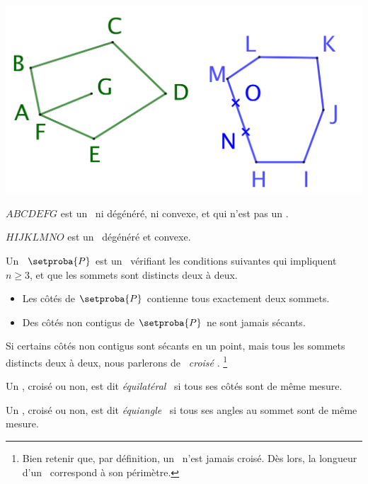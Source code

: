 \begin{center}
	\small\itshape\centering
	\includegraphics[scale=.35]{content/polygon/def/degenerated-ncycles.png}
	
	\smallskip
	$ABCDEFG$ est un \ncycle\ ni dégénéré, ni convexe, et qui n'est pas un \ngone.
	
	\smallskip
	$HIJKLMNO$ est un \ncycle\ dégénéré et convexe.
\end{center}




\newpage

\begin{defi}
	Un \og \emph{\ngone} \fg\ $\setproba{P}$ est un \ncycle\ vérifiant les conditions suivantes qui impliquent $n \geq 3$, et que les sommets sont distincts deux à deux.
	\begin{itemize}
		\item Les côtés de $\setproba{P}$ contienne tous exactement deux sommets.

		\item Des côtés non contigus de $\setproba{P}$ ne sont jamais sécants.
	\end{itemize}


	Si certains côtés non contigus sont sécants en un point, mais tous les sommets distincts deux à deux, nous parlerons de \og \emph{\ngone\ croisé} \fg.%
	\footnote{
		Bien retenir que, par définition, un \ngone\ n'est jamais croisé.
		Dès lors, la longueur d'un \ngone\ correspond à son périmètre.
	}
\end{defi}


\begin{defi}
	Un \ngone, croisé ou non, est dit \og \emph{équilatéral} \fg\ si tous ses côtés sont de même mesure.
\end{defi}


\begin{defi}
	Un \ngone, croisé ou non, est dit \og \emph{équiangle} \fg\ si tous ses angles au sommet sont de même mesure.
\end{defi}


